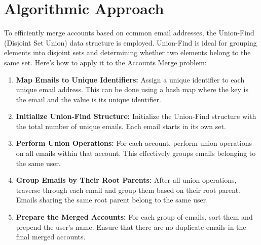 
\section*{Algorithmic Approach}

To efficiently merge accounts based on common email addresses, the Union-Find (Disjoint Set Union) data structure is employed. Union-Find is ideal for grouping elements into disjoint sets and determining whether two elements belong to the same set. Here's how to apply it to the Accounts Merge problem:

\begin{enumerate}
    \item \textbf{Map Emails to Unique Identifiers:}  
    Assign a unique identifier to each unique email address. This can be done using a hash map where the key is the email and the value is its unique identifier.

    \item \textbf{Initialize Union-Find Structure:}  
    Initialize the Union-Find structure with the total number of unique emails. Each email starts in its own set.

    \item \textbf{Perform Union Operations:}  
    For each account, perform union operations on all emails within that account. This effectively groups emails belonging to the same user.

    \item \textbf{Group Emails by Their Root Parents:}  
    After all union operations, traverse through each email and group them based on their root parent. Emails sharing the same root parent belong to the same user.

    \item \textbf{Prepare the Merged Accounts:}  
    For each group of emails, sort them and prepend the user's name. Ensure that there are no duplicate emails in the final merged accounts.
\end{enumerate}

